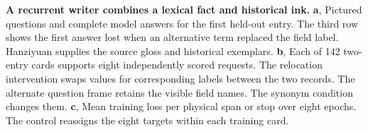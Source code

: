 \textbf{A recurrent writer combines a lexical fact and historical ink.} \textbf{a}, Pictured questions and complete model answers for the first held-out entry. The third row shows the first answer lost when an alternative term replaced the field label. Hanziyuan supplies the source gloss and historical exemplars. \textbf{b}, Each of 142 two-entry cards supports eight independently scored requests. The relocation intervention swaps values for corresponding labels between the two records. The alternate question frame retains the visible field names. The synonym condition changes them. \textbf{c}, Mean training loss per physical span or stop over eight epochs. The control reassigns the eight targets within each training card.
